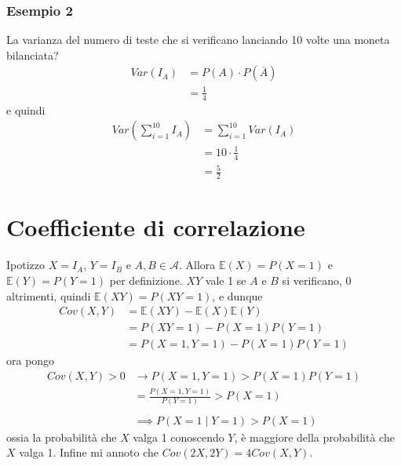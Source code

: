 \documentclass[11pt]{report}
\begin{document}
\subsubsection{Esempio 2}
La varianza del numero di teste che si verificano lanciando 10 volte una moneta bilanciata?
\begin{equation}
    \begin{split}
        Var(I_A) & = P(A) \cdot P(\overline{A})\\
        & = \frac{1}{4}
    \end{split}
\end{equation}
e quindi
\begin{equation}
    \begin{split}
        Var\left(\sum_{i=1}^{10} I_A\right) & = \sum_{i=1}^{10} Var(I_A)\\
        & = 10 \cdot \frac{1}{4}\\
        & = \frac{5}{2}
    \end{split}
\end{equation}

\section{Coefficiente di correlazione}
Ipotizzo $X = I_A$, $Y = I_B$ e $A,B \in \mathcal{A}$. Allora $\mathbb{E}(X) = P(X = 1)$ e $\mathbb{E}(Y) = P(Y = 1)$ per definizione. $XY$ vale 1 se $A$ e $B$ si verificano, 0 altrimenti, quindi $\mathbb{E}(XY) = P(XY = 1)$, e dunque
\begin{equation}
    \begin{split}
        Cov(X,Y) & = \mathbb{E}(XY) - \mathbb{E}(X)\mathbb{E}(Y)\\
        & = P(XY = 1) - P(X = 1)P(Y = 1)\\
        & = P(X=1, Y=1) - P(X = 1)P(Y = 1)
    \end{split}
\end{equation}
ora pongo
\begin{equation}
    \begin{split}
        Cov(X,Y) > 0 & \rightarrow P(X=1, Y=1) > P(X=1)P(Y=1)\\
        & = \frac{P(X=1, Y=1)}{P(Y=1)} > P(X=1)\\
        \\
        & \implies P(X=1 \mid Y=1) > P(X=1)
    \end{split}
\end{equation}
ossia la probabilità che $X$ valga 1 conoscendo $Y$, è maggiore della probabilità che $X$ valga 1. Infine mi annoto che $Cov(2X, 2Y) = 4Cov(X,Y)$.
\end{document}
